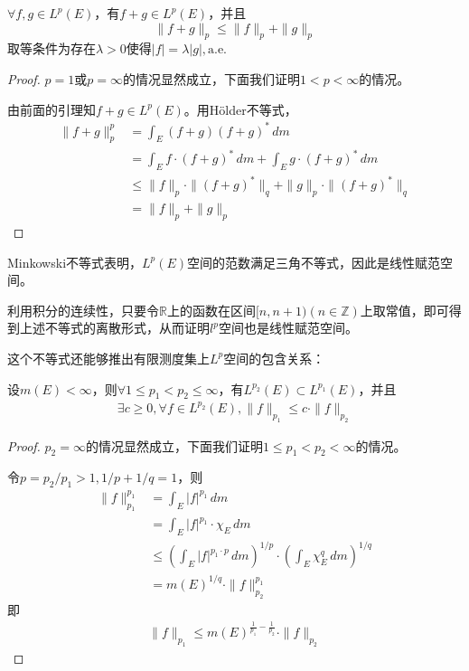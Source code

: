 \begin{theorem}[Minkowski不等式]
    $\forall f,g\in L^p(E)$，有$f+g\in L^p(E)$，并且
    \[\|f+g\|_p\leq \|f\|_p+\|g\|_p\]
    取等条件为存在$\lambda>0$使得$|f|=\lambda |g|,\text{a.e.}$
\end{theorem}
\begin{proof}
    $p=1$或$p=\infty$的情况显然成立，下面我们证明$1<p<\infty$的情况。

    由前面的引理知$f+g\in L^p(E)$。用Hölder不等式，\begin{align*}
    \|f+g\|_p^p & =\int_{E}(f+g)(f+g)^*\,dm \\
                 & =\int_{E}f\cdot (f+g)^*\,dm+\int_{E}g\cdot (f+g)^*\,dm \\
                 & \leq \|f\|_p\cdot \|(f+g)^*\|_q+\|g\|_p\cdot \|(f+g)^*\|_q \\
                 & =\|f\|_p+\|g\|_p
    \end{align*}
\end{proof}

Minkowski不等式表明，$L^p(E)$空间的范数满足三角不等式，因此是线性赋范空间。

利用积分的连续性，只要令$\mathbb{R} $上的函数在区间$[n,n+1)(n\in\mathbb{Z} )$上取常值，即可得到上述不等式的离散形式，从而证明$l^p$空间也是线性赋范空间。

这个不等式还能够推出有限测度集上$L^p$空间的包含关系：
\begin{corollary}
    设$m(E)<\infty$，则$\forall 1\leq p_1<p_2\leq \infty$，有$L^{p_2}(E)\subset L^{p_1}(E)$，并且\begin{align*}
        \exists c\geq 0,\forall f\in L^{p_2}(E),\|f\|_{p_1}\leq c\cdot \|f\|_{p_2}
    \end{align*}
\end{corollary}
\begin{proof}
    $p_2=\infty$的情况显然成立，下面我们证明$1\leq p_1<p_2<\infty$的情况。

    令$p=p_2/p_1>1,1/p+1/q=1$，则\begin{align*}
        \|f\|_{p_1}^{p_1} & =\int_{E}|f|^{p_1}\,dm \\
                     & =\int_{E}|f|^{p_1}\cdot \chi_E\,dm \\
                     & \leq \left(\int_{E}|f|^{p_1\cdot p}\,dm\right)^{1/p}\cdot \left(\int_{E}\chi_E^q\,dm\right)^{1/q} \\
                     & =m(E)^{1/q}\cdot \|f\|_{p_2}^{p_1}
    \end{align*}
    即\begin{align*}
        \|f\|_{p_1}\leq m(E)^{\frac{1}{p_1}-\frac{1}{p_2}}\cdot \|f\|_{p_2}
    \end{align*}
\end{proof}


